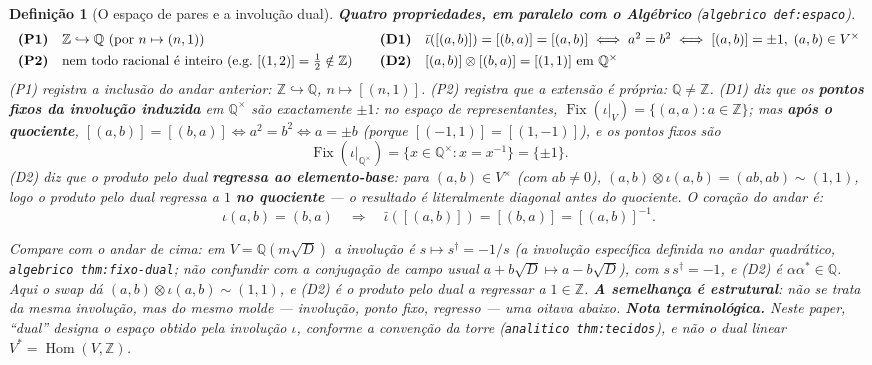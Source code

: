 \documentclass[11pt,a4paper]{article}
\newtheorem{definicao}{Definição}
\newcommand{\code}[1]{\texttt{\small #1}}
\newcommand{\dg}{^{\dagger}}
\begin{document}
\begin{definicao}[O espaço de pares e a involução dual]
\medskip\noindent
\textbf{Quatro propriedades, em paralelo com o Algébrico}
(\code{algebrico def:espaco}).
\[
\begin{array}{ll@{\qquad}ll}
\textbf{(P1)} & \mathbb{Z}\hookrightarrow\mathbb{Q}\
  (\text{por }n\mapsto(n,1))
  & \textbf{(D1)} & \bar\iota([(a,b)])=[(b,a)]=[(a,b)]
    \iff a^{2}=b^{2}
    \iff [(a,b)]=\pm1,\; (a,b)\in V^{\times}\\[4pt]
\textbf{(P2)} & \text{nem todo racional é inteiro (e.g.\ }[(1,2)]=\tfrac12\notin\mathbb{Z}\text{)}
  & \textbf{(D2)} & [(a,b)]\otimes[(b,a)]
    =[(1,1)]\ \text{em }\mathbb{Q}^{\times}
\end{array}
\]
(P1) registra a inclusão do andar anterior:
$\mathbb{Z}\hookrightarrow\mathbb{Q}$, $n\mapsto[(n,1)]$.
(P2) registra que a extensão é própria: $\mathbb{Q}\neq\mathbb{Z}$. (D1) diz que os \textbf{pontos fixos da involução induzida} em
$\mathbb{Q}^{\times}$ são exactamente $\pm 1$: no espaço de representantes,
$\operatorname{Fix}(\iota|_{V})=\{(a,a):a\in\mathbb{Z}\}$;
mas \textbf{após o quociente},
$[(a,b)]=[(b,a)]\iff a^{2}=b^{2}\iff a=\pm b$ (porque $[(-1,1)]=[(1,-1)]$),
e os pontos fixos são
\[
\operatorname{Fix}(\iota\vert_{\mathbb{Q}^{\times}})
=\{x\in\mathbb{Q}^{\times}:x=x^{-1}\}
=\{\pm1\}.
\] (D2) diz que o produto pelo dual
\textbf{regressa ao elemento-base}: para $(a,b)\in V^{\times}$ (com
$ab\neq 0$), $(a,b)\otimes\iota(a,b)=(ab,ab)\sim(1,1)$,
logo o produto pelo dual regressa a $1$ \textbf{no quociente} --- o resultado
é literalmente diagonal antes do quociente. O coração do andar é:
\[
\boxed{
\iota(a,b)=(b,a)
\quad\Longrightarrow\quad
\bar\iota([(a,b)])=[(b,a)]=[(a,b)]^{-1}.
}
\]

\medskip\noindent
Compare com o andar de cima: em $V=\mathbb{Q}(m\sqrt D)$ a involução é
$s\mapsto s\dg=-1/s$ (a involução específica definida no andar quadrático,
\code{algebrico thm:fixo-dual}; não confundir com a conjugação de campo usual
$a+b\sqrt D\mapsto a-b\sqrt D$), com $s\,s\dg=-1$, e (D2) é
$\alpha\alpha^{*}\in\mathbb{Q}$. Aqui o swap dá
$(a,b)\otimes\iota(a,b)\sim(1,1)$, e (D2) é o produto pelo dual a regressar a
$1\in\mathbb{Z}$. \textbf{A semelhança é estrutural}: não se trata da mesma
involução, mas do mesmo \emph{molde} --- involução, ponto fixo, regresso ---
uma oitava abaixo.
\medskip\noindent
\textbf{Nota terminológica.} Neste paper, ``dual'' designa o espaço obtido
pela involução $\iota$, conforme a convenção da torre
(\code{analitico thm:tecidos}), e não o dual linear
$V^{*}=\operatorname{Hom}(V,\mathbb{Z})$.
\end{definicao}
\end{document}
